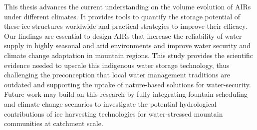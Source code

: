 This thesis advances the current understanding on the volume evolution of AIRs under different climates. It
provides tools to quantify the storage potential of these ice structures worldwide and practical strategies to
improve their efficacy. Our findings are essential to design AIRs that increase the reliability of water supply
in highly seasonal and arid environments and improve water security and climate change adaptation in mountain
regions. This study provides the scientific evidence needed to upscale this indigenous water storage technology,
thus challenging the preconception that local water management traditions are outdated and supporting the uptake
of nature-based solutions for water-security.  Future work may build on this research by fully integrating
fountain scheduling and climate change scenarios to investigate the potential hydrological contributions of ice
harvesting technologies for water-stressed mountain communities at catchment scale.
